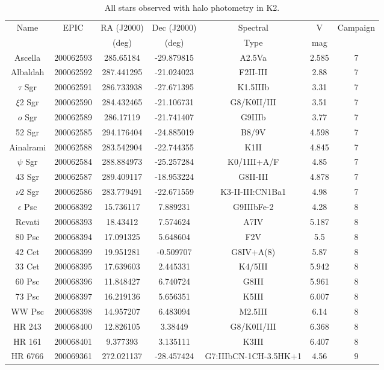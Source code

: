 \begin{table*}
\caption{All stars observed with halo photometry in K2.\label{table_all}}
\begin{tabular}{ccccccc}
\hline \hline
Name & EPIC & RA (J2000) & Dec (J2000) & Spectral & V & Campaign \\
 &  & (deg) & (deg) & Type & mag &  \\
\hline
Ascella & 200062593 & 285.65184 & -29.879815 & A2.5Va & 2.585 & 7 \\
Albaldah & 200062592 & 287.441295 & -21.024023 & F2II-III & 2.88 & 7 \\
$\tau$ Sgr & 200062591 & 286.733938 & -27.671395 & K1.5IIIb & 3.31 & 7 \\
$\xi$2 Sgr & 200062590 & 284.432465 & -21.106731 & G8/K0II/III & 3.51 & 7 \\
$o$ Sgr & 200062589 & 286.17119 & -21.741407 & G9IIIb & 3.77 & 7 \\
52 Sgr & 200062585 & 294.176404 & -24.885019 & B8/9V & 4.598 & 7 \\
Ainalrami & 200062588 & 283.542904 & -22.744355 & K1II & 4.845 & 7 \\
$\psi$ Sgr & 200062584 & 288.884973 & -25.257284 & K0/1III+A/F & 4.85 & 7 \\
43 Sgr & 200062587 & 289.409117 & -18.953224 & G8II-III & 4.878 & 7 \\
$\nu$2 Sgr & 200062586 & 283.779491 & -22.671559 & K3-II-III:CN1Ba1 & 4.98 & 7 \\
$\epsilon$ Psc & 200068392 & 15.736117 & 7.889231 & G9IIIbFe-2 & 4.28 & 8 \\
Revati & 200068393 & 18.43412 & 7.574624 & A7IV & 5.187 & 8 \\
80 Psc & 200068394 & 17.091325 & 5.648604 & F2V & 5.5 & 8 \\
42 Cet & 200068399 & 19.951281 & -0.509707 & G8IV+A(8) & 5.87 & 8 \\
33 Cet & 200068395 & 17.639603 & 2.445331 & K4/5III & 5.942 & 8 \\
60 Psc & 200068396 & 11.848427 & 6.740724 & G8III & 5.961 & 8 \\
73 Psc & 200068397 & 16.219136 & 5.656351 & K5III & 6.007 & 8 \\
WW Psc & 200068398 & 14.957207 & 6.483094 & M2.5III & 6.14 & 8 \\
HR 243 & 200068400 & 12.826105 & 3.38449 & G8/K0II/III & 6.368 & 8 \\
HR 161 & 200068401 & 9.377393 & 3.135111 & K3III & 6.407 & 8 \\
HR 6766 & 200069361 & 272.021137 & -28.457424 & G7:IIIbCN-1CH-3.5HK+1 & 4.56 & 9 \\

\end{tabular}
\end{table*}
